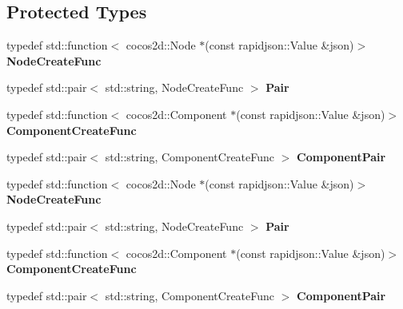 \subsection*{Protected Types}
\begin{DoxyCompactItemize}
\item 
\mbox{\label{classCSLoader_afbd75f1d316fed90b62ddc23e8123d09}} 
typedef std\+::function$<$ cocos2d\+::\+Node $\ast$(const rapidjson\+::\+Value \&json)$>$ {\bfseries Node\+Create\+Func}
\item 
\mbox{\label{classCSLoader_a3e36e051581437b527d54266fee2ab5a}} 
typedef std\+::pair$<$ std\+::string, Node\+Create\+Func $>$ {\bfseries Pair}
\item 
\mbox{\label{classCSLoader_a8c66b226f5fe6228770841e0272688d1}} 
typedef std\+::function$<$ cocos2d\+::\+Component $\ast$(const rapidjson\+::\+Value \&json)$>$ {\bfseries Component\+Create\+Func}
\item 
\mbox{\label{classCSLoader_ab3be6ec0948ddcf5f41616f4c25f0015}} 
typedef std\+::pair$<$ std\+::string, Component\+Create\+Func $>$ {\bfseries Component\+Pair}
\item 
\mbox{\label{classCSLoader_afbd75f1d316fed90b62ddc23e8123d09}} 
typedef std\+::function$<$ cocos2d\+::\+Node $\ast$(const rapidjson\+::\+Value \&json)$>$ {\bfseries Node\+Create\+Func}
\item 
\mbox{\label{classCSLoader_a3e36e051581437b527d54266fee2ab5a}} 
typedef std\+::pair$<$ std\+::string, Node\+Create\+Func $>$ {\bfseries Pair}
\item 
\mbox{\label{classCSLoader_a8c66b226f5fe6228770841e0272688d1}} 
typedef std\+::function$<$ cocos2d\+::\+Component $\ast$(const rapidjson\+::\+Value \&json)$>$ {\bfseries Component\+Create\+Func}
\item 
\mbox{\label{classCSLoader_ab3be6ec0948ddcf5f41616f4c25f0015}} 
typedef std\+::pair$<$ std\+::string, Component\+Create\+Func $>$ {\bfseries Component\+Pair}
\end{DoxyCompactItemize}
